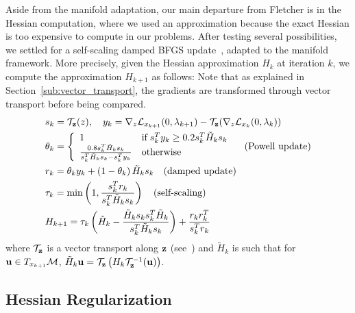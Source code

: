 Aside from the manifold adaptation, our main departure from Fletcher is in the Hessian computation, where we used an approximation because the exact Hessian is too expensive to compute in our problems.
After testing several possibilities, we settled for a self-scaling damped BFGS update~\cite{nocedal:mp:1993,nocedal:book:2006}, adapted to the manifold framework.
More precisely, given the Hessian approximation $H_k$ at iteration $k$, we compute the approximation $H_{k+1}$ as follows:
Note that as explained in Section~\ref{sub:vector_transport}, the gradients are transformed through vector transport before being compared.
\begin{align}
  &s_k = \mathcal{T}_{\bf z}(z), \quad y_k = \nabla_z \mathcal{L}_{x_{k+1}}(0,\lambda_{k+1}) - \mathcal{T}_{\bf z}(\nabla_z\mathcal{L}_{x_{k}}(0,\lambda_{k})) \nonumber\\
  &\theta_k = \left\{\begin{array}{ll}
    1 & \mbox{if} \; s_k^T y_k \geq 0.2 s_k^T \tilde{H}_k s_k \\
    \frac{0.8 s_k^T \tilde{H}_k s_k}{s_k^T \tilde{H}_k s_k - s_k^T y_k} & \mbox{otherwise}
  \end{array}\right. \quad \mbox{(Powell update)}\nonumber\\
  &r_k = \theta_k y_k + \left(1-\theta_k\right) \tilde{H}_k s_k \quad \mbox{(damped update)} \nonumber\\
  &\tau_k = \min\left(1, \frac{s_k^T r_k}{s_k^T \tilde{H}_k s_k} \right) \quad \mbox{(self-scaling)} \nonumber\\
  &H_{k+1} = \tau_k \left(\tilde{H}_k-\frac{\tilde{H}_k s_k s_k^T \tilde{H}_k}{s_k^T \tilde{H}_k s_k} \right) + \frac{r_k r_k^T}{s_k^T r_k} \nonumber%
\end{align}
where $\mathcal{T}_{\bf z}$ is a vector transport along ${\bf z}$ (see~\cite{absil:book:2008}) and $\tilde{H}_k$ is such that for ${\bf u} \in T_{x_{k+1}} \mathcal{M}$, $\tilde{H}_k {\bf u} = \mathcal{T}_{\bf z}\left(H_k \mathcal{T}_{\bf z}^{-1}({\bf u}) \right)$.

\subsection{Hessian Regularization}
\label{sub:hessian_regularization}

